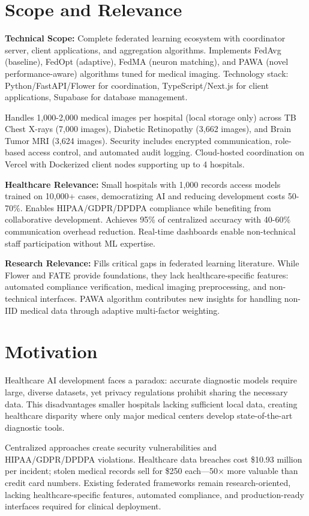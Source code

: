 \section{Scope and Relevance}

\textbf{Technical Scope:} Complete federated learning ecosystem with coordinator server, client applications, and aggregation algorithms. Implements FedAvg (baseline), FedOpt (adaptive), FedMA (neuron matching), and PAWA (novel performance-aware) algorithms tuned for medical imaging. Technology stack: Python/FastAPI/Flower for coordination, TypeScript/Next.js for client applications, Supabase for database management.

Handles 1,000-2,000 medical images per hospital (local storage only) across TB Chest X-rays (7,000 images), Diabetic Retinopathy (3,662 images), and Brain Tumor MRI (3,624 images). Security includes encrypted communication, role-based access control, and automated audit logging. Cloud-hosted coordination on Vercel with Dockerized client nodes supporting up to 4 hospitals.

\textbf{Healthcare Relevance:} Small hospitals with 1,000 records access models trained on 10,000+ cases, democratizing AI and reducing development costs 50-70\%. Enables HIPAA/GDPR/DPDPA compliance while benefiting from collaborative development. Achieves 95\% of centralized accuracy with 40-60\% communication overhead reduction. Real-time dashboards enable non-technical staff participation without ML expertise.

\textbf{Research Relevance:} Fills critical gaps in federated learning literature. While Flower and FATE provide foundations, they lack healthcare-specific features: automated compliance verification, medical imaging preprocessing, and non-technical interfaces. PAWA algorithm contributes new insights for handling non-IID medical data through adaptive multi-factor weighting.

\section{Motivation}

Healthcare AI development faces a paradox: accurate diagnostic models require large, diverse datasets, yet privacy regulations prohibit sharing the necessary data. This disadvantages smaller hospitals lacking sufficient local data, creating healthcare disparity where only major medical centers develop state-of-the-art diagnostic tools.

Centralized approaches create security vulnerabilities and HIPAA/GDPR/DPDPA violations. Healthcare data breaches cost \$10.93 million per incident; stolen medical records sell for \$250 each—50$\times$ more valuable than credit card numbers. Existing federated frameworks remain research-oriented, lacking healthcare-specific features, automated compliance, and production-ready interfaces required for clinical deployment.

